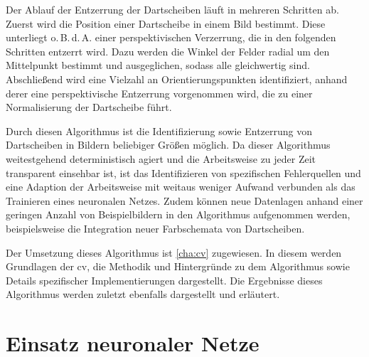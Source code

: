 Der Ablauf der Entzerrung der Dartscheiben läuft in mehreren Schritten ab. Zuerst wird die Position einer Dartscheibe in einem Bild bestimmt. Diese unterliegt o.\,B.\,d.\,A. einer perspektivischen Verzerrung, die in den folgenden Schritten entzerrt wird. Dazu werden die Winkel der Felder radial um den Mittelpunkt bestimmt und ausgeglichen, sodass alle gleichwertig sind. Abschließend wird eine Vielzahl an Orientierungspunkten identifiziert, anhand derer eine perspektivische Entzerrung vorgenommen wird, die zu einer Normalisierung der Dartscheibe führt.

Durch diesen Algorithmus ist die Identifizierung sowie Entzerrung von Dartscheiben in Bildern beliebiger Größen möglich. Da dieser Algorithmus weitestgehend deterministisch agiert und die Arbeitsweise zu jeder Zeit transparent einsehbar ist, ist das Identifizieren von spezifischen Fehlerquellen und eine Adaption der Arbeitsweise mit weitaus weniger Aufwand verbunden als das Trainieren eines neuronalen Netzes. Zudem können neue Datenlagen anhand einer geringen Anzahl von Beispielbildern in den Algorithmus aufgenommen werden, beispielsweise die Integration neuer Farbschemata von Dartscheiben.

Der Umsetzung dieses Algorithmus ist \autoref{cha:cv} zugewiesen. In diesem werden Grundlagen der \ac{cv}, die Methodik und Hintergründe zu dem Algorithmus sowie Details spezifischer Implementierungen dargestellt. Die Ergebnisse dieses Algorithmus werden zuletzt ebenfalls dargestellt und erläutert.




\section{Einsatz neuronaler Netze}
\label{sec:einsatz_nn}

